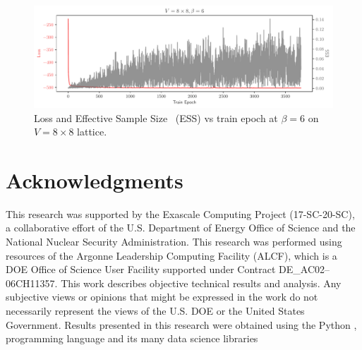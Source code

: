 \documentclass[a4paper,11pt]{article}
\begin{document}
\begin{figure}
    \centering
    \includegraphics[width=\linewidth]{assets/ess_loss_dkl_train.pdf}
    \caption{\label{subfig:loss}Loss and Effective Sample
        Size~\cite{2018arXiv180904129E} (ESS) vs train epoch at \(\beta = 6\)
    on \(V = 8\times 8\) lattice.}
\end{figure}
%
\section{\label{sec:ack}Acknowledgments}
This research was supported by the Exascale Computing Project (17-SC-20-SC), a
collaborative effort of the U.S. Department of Energy Office of Science and the
National Nuclear Security Administration.
%
This research was performed using resources of the Argonne Leadership Computing
Facility (ALCF), which is a DOE Office of Science User Facility supported under
Contract DE\_AC02--06CH11357. 
%
This work describes objective technical results and analysis.
%
Any subjective views or opinions that might be expressed in the work do not
necessarily represent the views of the U.S. DOE or the United States
Government.
%
Results presented in this research were obtained using the Python
\citep{van1995python}, programming language and its many data science libraries
\cite{%
    matplotlib,
    harris2020array,
    ipython4160251%
}
%



\end{document}
